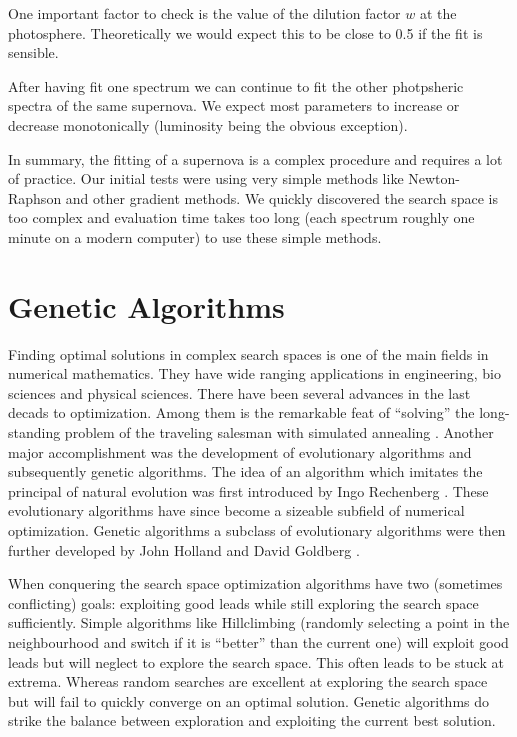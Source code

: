 One important factor to check is the value of the dilution factor $w$ at the photosphere. Theoretically we would expect this to be close to 0.5 if the fit is sensible. 

After having fit one spectrum we can continue to fit the other photpsheric spectra of the same supernova. We expect most parameters to increase or decrease monotonically (luminosity being the obvious exception). 

In summary, the fitting of a supernova is a complex procedure and requires a lot of practice. Our initial tests were using very simple methods like Newton-Raphson and other gradient methods. We quickly discovered the search space is too complex and evaluation time takes too long (each spectrum roughly one minute on a modern computer) to use these simple methods. 

 
\section{Genetic Algorithms}

Finding optimal solutions in complex search spaces is one of the main fields in numerical mathematics.  They have wide ranging applications in engineering, bio sciences and physical sciences. There have been several advances in the last decads to optimization. 
Among them is the  remarkable feat of ``solving'' the long-standing problem of the traveling salesman with simulated annealing \citep{Kirkpatrick13051983}.
Another major accomplishment was the development of evolutionary algorithms and subsequently genetic algorithms. The idea of an algorithm which imitates the principal of natural evolution was first introduced by Ingo Rechenberg \citep{Rechenberg1973}. These evolutionary algorithms have since become a sizeable subfield of numerical optimization. Genetic algorithms a subclass of evolutionary algorithms were then further developed by John Holland and David Goldberg \citep{citeulike:125978}.

When conquering the search space optimization algorithms have two (sometimes conflicting) goals: exploiting good leads while still exploring the search space sufficiently. Simple algorithms like Hillclimbing (randomly selecting a point in the neighbourhood and switch if it is ``better'' than the current one) will exploit good leads but will neglect to explore the search space. This often leads to be stuck at extrema. Whereas random searches are excellent at exploring the search space but will fail to quickly converge on an optimal solution. Genetic algorithms do strike the balance between exploration and exploiting the current best solution.

